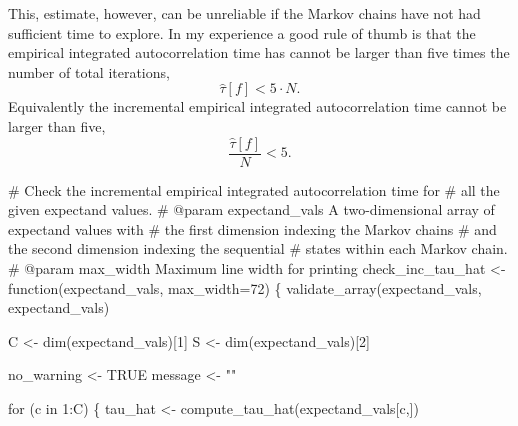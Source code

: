 \documentclass[
  letterpaper,
  DIV=11,
  numbers=noendperiod]{scrartcl}
\newenvironment{Shaded}{\begin{snugshade}}{\end{snugshade}}
\newcommand{\CommentTok}[1]{\textcolor[rgb]{0.37,0.37,0.37}{#1}}
\newcommand{\ControlFlowTok}[1]{\textcolor[rgb]{0.00,0.23,0.31}{#1}}
\newcommand{\DecValTok}[1]{\textcolor[rgb]{0.68,0.00,0.00}{#1}}
\newcommand{\KeywordTok}[1]{\textcolor[rgb]{0.00,0.23,0.31}{#1}}
\newcommand{\NormalTok}[1]{\textcolor[rgb]{0.00,0.23,0.31}{#1}}
\newcommand{\OperatorTok}[1]{\textcolor[rgb]{0.37,0.37,0.37}{#1}}
\newcommand{\StringTok}[1]{\textcolor[rgb]{0.13,0.47,0.30}{#1}}
\begin{document}
This, estimate, however, can be unreliable if the Markov chains have not
had sufficient time to explore. In my experience a good rule of thumb is
that the empirical integrated autocorrelation time has cannot be larger
than five times the number of total iterations, \[
\hat{\tau}[f] < 5 \cdot N.
\] Equivalently the incremental empirical integrated autocorrelation
time cannot be larger than five, \[
\frac{ \hat{\tau}[f] }{N} < 5.
\]

\begin{Shaded}
\begin{Highlighting}[]
\CommentTok{\# Check the incremental empirical integrated autocorrelation time for}
\CommentTok{\# all the given expectand values.}
\CommentTok{\# @param expectand\_vals A two{-}dimensional array of expectand values with}
\CommentTok{\#                       the first dimension indexing the Markov chains}
\CommentTok{\#                       and the second dimension indexing the sequential}
\CommentTok{\#                       states within each Markov chain.}
\CommentTok{\# @param max\_width Maximum line width for printing}
\NormalTok{check\_inc\_tau\_hat }\OperatorTok{\textless{}{-}}\NormalTok{ function(expectand\_vals,}
\NormalTok{                              max\_width}\OperatorTok{=}\DecValTok{72}\NormalTok{) \{}
\NormalTok{  validate\_array(expectand\_vals, }\StringTok{\textquotesingle{}expectand\_vals\textquotesingle{}}\NormalTok{)}

\NormalTok{  C }\OperatorTok{\textless{}{-}}\NormalTok{ dim(expectand\_vals)[}\DecValTok{1}\NormalTok{]}
\NormalTok{  S }\OperatorTok{\textless{}{-}}\NormalTok{ dim(expectand\_vals)[}\DecValTok{2}\NormalTok{]}

\NormalTok{  no\_warning }\OperatorTok{\textless{}{-}}\NormalTok{ TRUE}
\NormalTok{  message }\OperatorTok{\textless{}{-}} \StringTok{""}

  \ControlFlowTok{for}\NormalTok{ (c }\KeywordTok{in} \DecValTok{1}\NormalTok{:C) \{}
\NormalTok{    tau\_hat }\OperatorTok{\textless{}{-}}\NormalTok{ compute\_tau\_hat(expectand\_vals[c,])}


\end{Highlighting}
\end{Shaded}
\end{document}
